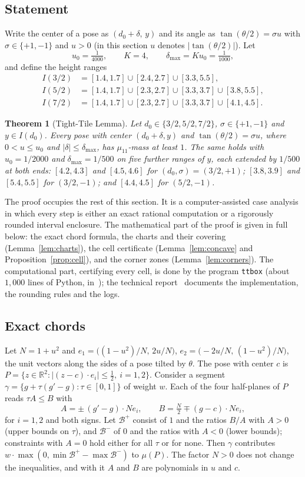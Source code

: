 \documentclass[11pt]{amsart}
\newtheorem{theorem}{Theorem}
\theoremstyle{definition}
\theoremstyle{remark}
\newcommand{\R}{\mathbb R}
\begin{document}
\subsection{Statement}
Write the center of a pose as $(d_0+\delta,\,y)$ and its angle as $\tan(\theta/2)=\sigma u$ with $\sigma\in\{+1,-1\}$
and $u>0$ (in this section $u$ denotes $|\tan(\theta/2)|$). Let
\[
u_0=\tfrac1{4000},\qquad K=4,\qquad \delta_{\max}=Ku_0=\tfrac1{1000},
\]
and define the height ranges
\begin{align*}
I(3/2)&=[1.4,1.7]\cup[2.4,2.7]\cup[3.3,5.5],\\
I(5/2)&=[1.4,1.7]\cup[2.3,2.7]\cup[3.3,3.7]\cup[3.8,5.5],\\
I(7/2)&=[1.4,1.7]\cup[2.3,2.7]\cup[3.3,3.7]\cup[4.1,4.5].
\end{align*}

\begin{theorem}[Tight-Tile Lemma]\label{thm:tt}
Let $d_0\in\{3/2,5/2,7/2\}$, $\sigma\in\{+1,-1\}$ and $y\in I(d_0)$. Every pose with center $(d_0+\delta,y)$ and
$\tan(\theta/2)=\sigma u$, where $0<u\le u_0$ and $|\delta|\le\delta_{\max}$, has $\mu_{11}$-mass at least $1$. The
same holds with $u_0=1/2000$ and $\delta_{\max}=1/500$ on five further ranges of $y$, each extended by $1/500$ at both
ends: $[4.2,4.3]$ and $[4.5,4.6]$ for $(d_0,\sigma)=(3/2,+1)$; $[3.8,3.9]$ and $[5.4,5.5]$ for $(3/2,-1)$; and
$[4.4,4.5]$ for $(5/2,-1)$.
\end{theorem}

The proof occupies the rest of this section. It is a computer-assisted case analysis in which every step is either
an exact rational computation or a rigorously rounded interval enclosure. The mathematical part of the proof is given in full below:
the exact chord formula, the charts and their covering (Lemma~\ref{lem:charts}), the cell certificate
(Lemma~\ref{lem:concave} and Proposition~\ref{prop:cell}), and the corner zones (Lemma~\ref{lem:corners}). The
computational part, certifying every cell, is done by the program \texttt{ttbox} (about $1{,}000$ lines of Python,
in~\cite{repo}); the technical report~\cite{ttproof} documents the implementation, the rounding rules and the
logs.

\subsection{Exact chords}
Let $N=1+u^2$ and $e_1=\bigl((1-u^2)/N,\,2u/N\bigr)$, $e_2=\bigl(-2u/N,\,(1-u^2)/N\bigr)$, the unit vectors along the
sides of a pose tilted by $\theta$. The pose with center $c$ is $P=\{z\in\R^2:|(z-c)\cdot e_i|\le\frac12,\ i=1,2\}$.
Consider a segment $\gamma=\{g+\tau(g'-g):\tau\in[0,1]\}$ of weight $w$. Each of the four half-planes of $P$ reads
$\tau A\le B$ with
\[
A=\pm\,(g'-g)\cdot Ne_i,\qquad B=\tfrac N2\mp(g-c)\cdot Ne_i ,
\]
for $i=1,2$ and both signs. Let $\mathcal B^+$ consist of $1$ and the ratios $B/A$ with $A>0$ (upper bounds on
$\tau$), and $\mathcal B^-$ of $0$ and the ratios with $A<0$ (lower bounds); constraints with $A=0$ hold either for
all $\tau$ or for none. Then $\gamma$ contributes $w\cdot\max(0,\min\mathcal B^+-\max\mathcal B^-)$ to $\mu(P)$.
The factor $N>0$ does not change the inequalities, and with it $A$ and $B$ are polynomials in $u$ and $c$.
\end{document}
